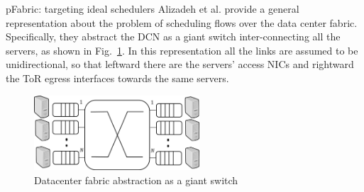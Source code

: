 \begin{subsection}{pFabric: targeting ideal schedulers}
Alizadeh et al. provide a general representation about the problem of scheduling flows over the data center fabric. Specifically, they abstract the DCN as a giant switch inter-connecting all the servers, as shown in Fig.~\ref{fig:pfabricdcn}. In this representation all the links are assumed to be unidirectional, so that leftward there are the servers' access NICs and rightward the ToR egress interfaces towards the same servers.

\begin{figure}
	\centering
	\includegraphics[width=0.55\textwidth]{Chapter2/Figures/pfabricdcn}
	\caption{Datacenter fabric abstraction as a giant switch}
	\label{fig:pfabricdcn}
\end{figure}


\end{subsection}
